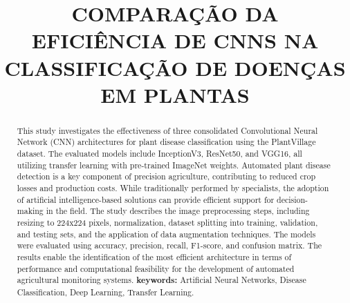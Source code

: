 \documentclass[12pt]{article}
\title{COMPARAÇÃO DA EFICIÊNCIA DE CNNS NA CLASSIFICAÇÃO DE DOENÇAS EM PLANTAS}
\begin{document}
\maketitle

\begin{abstract}
This study investigates the effectiveness of three consolidated Convolutional Neural Network (CNN) architectures for plant disease classification using the PlantVillage dataset. The evaluated models include InceptionV3, ResNet50, and VGG16, all utilizing transfer learning with pre-trained ImageNet weights. Automated plant disease detection is a key component of precision agriculture, contributing to reduced crop losses and production costs. While traditionally performed by specialists, the adoption of artificial intelligence-based solutions can provide efficient support for decision-making in the field. The study describes the image preprocessing steps, including resizing to 224x224 pixels, normalization, dataset splitting into training, validation, and testing sets, and the application of data augmentation techniques. The models were evaluated using accuracy, precision, recall, F1-score, and confusion matrix. The results enable the identification of the most efficient architecture in terms of performance and computational feasibility for the development of automated agricultural monitoring systems. 
\textbf{keywords:} Artificial Neural Networks, Disease Classification, Deep Learning, Transfer Learning.
\end{abstract}

\renewcommand{\abstractname}{Resumo}
\end{document}
